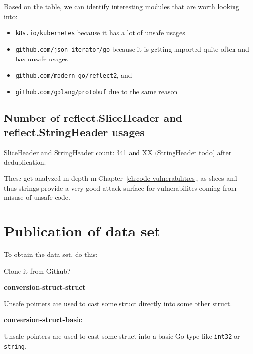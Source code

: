 Based on the table, we can identify interesting modules that are worth looking into:

\begin{itemize}
    \item \texttt{k8s.io/kubernetes} because it has a lot of unsafe usages
    \item \texttt{github.com/json-iterator/go} because it is getting imported quite often and has unsafe usages
    \item \texttt{github.com/modern-go/reflect2}, and
    \item \texttt{github.com/golang/protobuf} due to the same reason
\end{itemize}



\subsection{Number of reflect.SliceHeader and reflect.StringHeader usages}\label{subsec:results-sliceheader}

SliceHeader and StringHeader count: 341 and XX (StringHeader todo) after deduplication.

These get analyzed in depth in Chapter~\ref{ch:code-vulnerabilities}, as slices and thus strings provide a very good
attack surface for vulnerabilites coming from misuse of unsafe code.



\section{Publication of data set}\label{sec:survey-publication}

To obtain the data set, do this:

Clone it from Github?



\textbf{conversion-struct-struct}

Unsafe pointers are used to cast some struct directly into some other struct.




\textbf{conversion-struct-basic}

Unsafe pointers are used to cast some struct into a basic Go type like \texttt{int32} or \texttt{string}.

